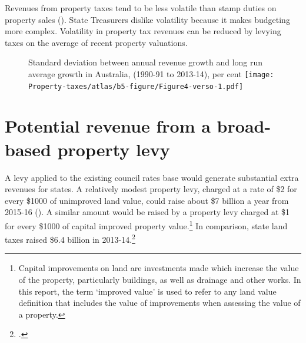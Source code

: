 \documentclass[twoside,english]{grattanBudgetRepairb5portrait}
\begin{document}
Revenues from property taxes tend to be less volatile than stamp duties on property sales (). State Treasurers dislike volatility because it makes budgeting more complex. Volatility in property tax revenues can be reduced by levying taxes on the average of recent property valuations. 

\begin{figure}
%
{Standard deviation between annual revenue growth and long run average growth in Australia, (1990-91 to 2013-14), per cent}
\texttt{[image: Property-taxes/atlas/b5-figure/Figure4-verso-1.pdf]}

\end{figure}
\FloatBarrier
\section{Potential revenue from a broad-based property levy\label{sec:PROP-3-3}}
A levy applied to the existing council rates base would generate substantial extra revenues for states. A relatively modest property levy, charged at a rate of \$2 for every \$1000 of unimproved land value, could raise about \$7 billion a year from 2015-16 (). A similar amount would be raised by a property levy charged at \$1 for every \$1000 of capital improved property value.\footnote{Capital improvements on land are investments made which increase the value of the property, particularly buildings, as well as drainage and other works. In this report, the term ‘improved value’ is used to refer to any land value definition that includes the value of improvements when assessing the value of a property.}   In comparison, state land taxes raised \$6.4 billion in 2013-14.\footcite{ABS2015h} 
\end{document}
